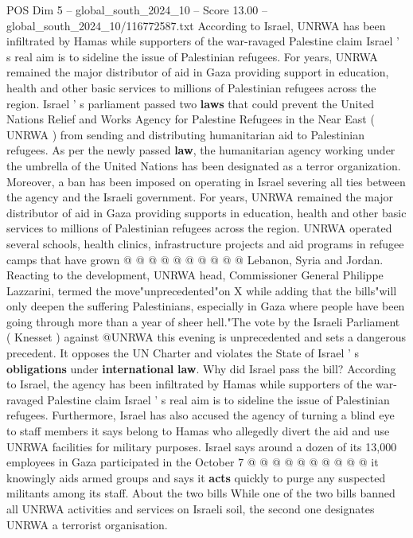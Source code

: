 \begin{textsample}{POS Dim 5 – global\_south\_2024\_10 – Score 13.00 – global\_south\_2024\_10/116772587.txt}  \label{ex:f5_pos_330}
According to Israel, UNRWA has been infiltrated by Hamas while supporters of the war-ravaged Palestine claim Israel ' s real aim is to sideline the issue of Palestinian refugees.
For years, UNRWA remained the major distributor of aid in Gaza providing support in education, health and other basic services to millions of Palestinian refugees across the region.
Israel ' s parliament passed two \textbf{laws} that could prevent the United Nations Relief and Works Agency for Palestine Refugees in the Near East ( UNRWA ) from sending and distributing humanitarian aid to Palestinian refugees.
As per the newly passed \textbf{law}, the humanitarian agency working under the umbrella of the United Nations has been designated as a terror organization.
Moreover, a ban has been imposed on operating in Israel severing all ties between the agency and the Israeli government.
For years, UNRWA remained the major distributor of aid in Gaza providing supports in education, health and other basic services to millions of Palestinian refugees across the region.
UNRWA operated several schools, health clinics, infrastructure projects and aid programs in refugee camps that have grown @ @ @ @ @ @ @ @ @ @ Lebanon, Syria and Jordan.
Reacting to the development, UNRWA head, Commissioner General Philippe Lazzarini, termed the move"unprecedented"on X while adding that the bills"will only deepen the suffering Palestinians, especially in Gaza where people have been going through more than a year of sheer hell."The vote by the Israeli Parliament ( Knesset ) against @UNRWA this evening is unprecedented and sets a dangerous precedent.
It opposes the UN Charter and violates the State of Israel ' s \textbf{obligations} under \textbf{international} \textbf{law}.
Why did Israel pass the bill?
According to Israel, the agency has been infiltrated by Hamas while supporters of the war-ravaged Palestine claim Israel ' s real aim is to sideline the issue of Palestinian refugees.
Furthermore, Israel has also accused the agency of turning a blind eye to staff members it says belong to Hamas who allegedly divert the aid and use UNRWA facilities for military purposes.
Israel says around a dozen of its 13,000 employees in Gaza participated in the October 7 @ @ @ @ @ @ @ @ @ @ it knowingly aids armed groups and says it \textbf{acts} quickly to purge any suspected militants among its staff.
About the two bills While one of the two bills banned all UNRWA activities and services on Israeli soil, the second one designates UNRWA a terrorist organisation.

\end{textsample}
